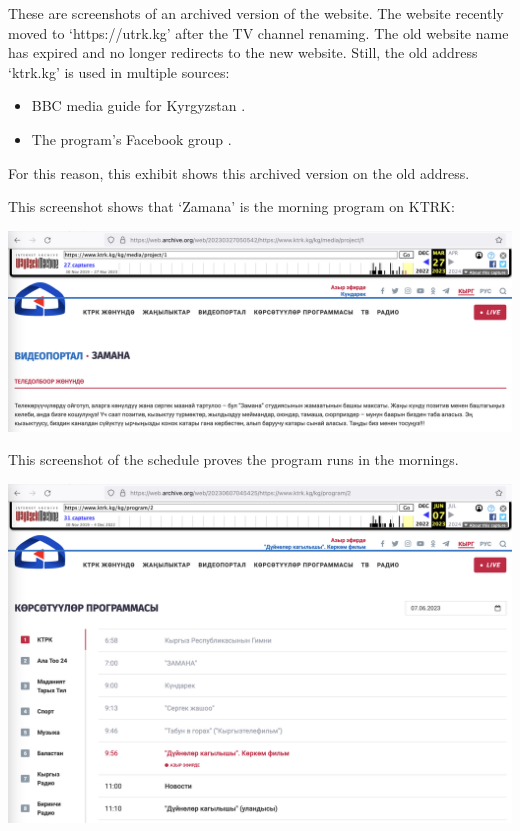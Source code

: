 
These are screenshots of an archived version of the website.
The website recently moved to `https://utrk.kg' after the TV channel renaming.
The old website name has expired and no longer redirects to the new website.
Still, the old address `ktrk.kg' is used in multiple sources:

\begin{itemize}
    \item BBC media guide for Kyrgyzstan .
    \item The program's Facebook group .
\end{itemize}

For this reason, this exhibit shows this archived version on the old address.

This screenshot shows that `Zamana' is the morning program on KTRK:

\begin{center}
    \includegraphics[width=\textwidth]{ktrk-zamana}
\end{center}
\pagebreak



This screenshot of the schedule proves the program runs in the mornings.

\begin{center}
    \includegraphics[width=\textwidth]{ktrk-schedule}
\end{center}



\pagebreak
